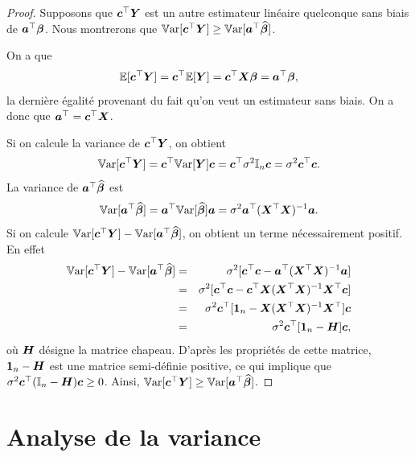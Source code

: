\begin{proof}
Supposons que $\bm{c}^\top\bm{Y}$ est un autre estimateur linéaire quelconque sans biais de $\bm{a}^\top\bm\beta$. Nous montrerons que $\mathbb{V}\text{ar}[\bm{c}^\top\bm{Y}] \geq \mathbb{V}\text{ar}[\bm{a}^\top\widehat{\bm\beta}]$.

On a que
	\[ \mathbb{E}[\bm{c}^\top\bm{Y}] = \bm{c}^\top\mathbb{E}[\bm{Y}]=\bm{c}^\top\bm{X}\bm\beta=\bm{a}^\top\bm\beta,
\]
la dernière égalité provenant du fait qu'on veut un estimateur sans biais.
On a donc que $\bm{a}^\top=\bm{c}^\top\bm{X}$.

Si on calcule la variance de $\bm{c}^\top\bm{Y}$, on obtient
	\[\mathbb{V}\text{ar}[\bm{c}^\top\bm{Y}]=\bm{c}^\top\mathbb{V}\text{ar}[\bm{Y}]\bm{c} = \bm{c}^\top \sigma^2 \mathbb{I}_n \bm{c} = \sigma^2 \bm{c}^\top \bm{c}.
\]
La variance de $\bm{a}^\top\widehat{\bm\beta}$ est
	\[\mathbb{V}\text{ar}[\bm{a}^\top\widehat{\bm\beta}] = \bm{a}^\top\mathbb{V}\text{ar}[\widehat{\bm\beta}]\bm{a} = \sigma^2 \bm{a}^\top(\bm{X}^\top\bm{X})^{-1}\bm{a}.
\]
Si on calcule $\mathbb{V}\text{ar}[\bm{c}^\top\bm{Y}]-\mathbb{V}\text{ar}[\bm{a}^\top\widehat{\bm\beta}]$, on obtient un terme nécessairement positif. En effet
\begin{eqnarray*}
	\mathbb{V}\text{ar}[\bm{c}^\top\bm{Y}]-\mathbb{V}\text{ar}[\bm{a}^\top\widehat{\bm\beta}] &=& \sigma^2 [\bm{c}^\top\bm{c}-\bm{a}^\top(\bm{X}^\top\bm{X})^{-1}\bm{a}]\\
	&=& \sigma^2[\bm{c}^\top\bm{c}-\bm{c}^\top\bm{X}(\bm{X}^\top\bm{X})^{-1}\bm{X}^\top\bm{c}]\\
	&=& \sigma^2\bm{c}^\top[\bold{1}_n-\bm{X}(\bm{X}^\top\bm{X})^{-1}\bm{X}^\top]\bm{c}\\
	&=& \sigma^2\bm{c}^\top[\bold{1}_n-\bm{H}]\bm{c},
\end{eqnarray*}
où $\bm{H}$ désigne la matrice chapeau. D'après les propriétés de cette matrice, $\bold{1}_n-\bm{H}$ est une matrice semi-définie positive, ce qui implique que $\sigma^2\bm{c}^\top(\mathbb{I}_n-\bm{H})\bm{c} \geq 0$.
Ainsi, $\mathbb{V}\text{ar}[\bm{c}^\top\bm{Y}] \geq \mathbb{V}\text{ar}[\bm{a}^\top\widehat{\bm\beta}]$.
\end{proof}


\section{Analyse de la variance}

